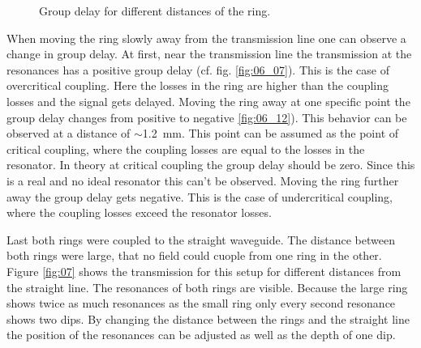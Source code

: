 \begin{figure}
\caption{Group delay for different distances of the ring.}%
\label{fig:06}%
\end{figure}
When moving the ring slowly away from the transmission line one can observe a change in group delay. At first, near the transmission line the transmission at the resonances has a positive group delay (cf. fig. \ref{fig:06_07}). This is the case of overcritical coupling. Here the losses in the ring are higher than the coupling losses and the signal gets delayed. Moving the ring away at one specific point the group delay changes from positive to negative \ref{fig:06_12}). This behavior can be observed at a distance of $\sim$1.2~mm. This point can be assumed as the point of critical coupling, where the coupling losses are equal to the losses in the resonator. In theory at critical coupling the group delay should be zero. Since this is a real and no ideal resonator this can't be observed.
Moving the ring further away the group delay gets negative. This is the case of undercritical coupling, where the coupling losses exceed the resonator losses. 

Last both rings were coupled to the straight waveguide. The distance between both rings were large, that no field could cuople from one ring in the other. Figure \ref{fig:07} shows the transmission for this setup for different distances from the straight line. The resonances of both rings are visible. Because the large ring shows twice as much resonances as the small ring only every second resonance shows two dips. By changing the distance between the rings and the straight line the position of the resonances can be adjusted as well as the depth of one dip.


